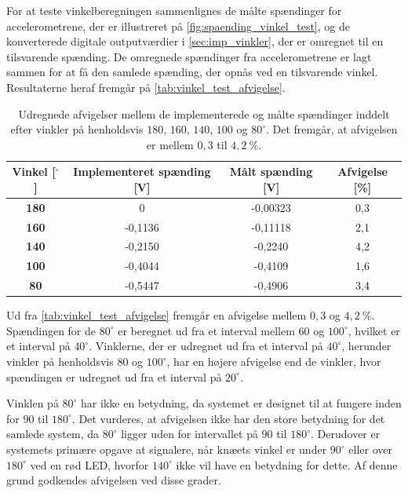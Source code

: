 For at teste vinkelberegningen sammenlignes de målte spændinger for accelerometrene, der er illustreret på \autoref{fig:spaending_vinkel_test}, og de konverterede digitale outputværdier i \autoref{sec:imp_vinkler}, der er omregnet til en tilsvarende spænding. 
De omregnede spændinger fra accelerometrene er lagt sammen for at få den samlede spænding, der opnås ved en tilsvarende vinkel. 
Resultaterne heraf fremgår på \autoref{tab:vinkel_test_afvigelse}.

\begin{table}[H]
\centering
\begin{tabular}{|c|c|c|c|}
\hline
\textbf{Vinkel {[}{$^{\circ}$}{]}} & \textbf{Implementeret spænding {[}V{]}} & \textbf{Målt spænding {[}V{]}} & \textbf{Afvigelse {[}\%{]}} \\ \hline
\textbf{180}                    & 0                         & -0,00323                       & 0,3                      \\ \hline
\textbf{160}                    & -0,1136                   & -0,11118                       & 2,1                       \\ \hline
\textbf{140}                    & -0,2150                   & -0,2240                        & 4,2                   \\ \hline
\textbf{100}                    & -0,4044                   & -0,4109                        & 1,6                    \\ \hline
\textbf{80}                     & -0,5447                   & -0,4906                        & 3,4                    \\ \hline
\end{tabular}
\caption{Udregnede afvigelser mellem de implementerede og målte spændinger inddelt efter vinkler på henholdsvis $180$, $160$, $140$, $100$ og $80^{\circ}$. Det fremgår, at afvigelsen er mellem $0,3$ til $4,2~\%$.}
\label{tab:vinkel_test_afvigelse}
\end{table}

\noindent
Ud fra \autoref{tab:vinkel_test_afvigelse} fremgår en afvigelse mellem $0,3$ og $4,2~\%$. Spændingen for de $80^{\circ}$ er beregnet ud fra et interval mellem $60$ og $100^{\circ}$, hvilket er et interval på $40^{\circ}$. Vinklerne, der er udregnet ud fra et interval på $40^{\circ}$, herunder vinkler på henholdsvis $80$ og $100^{\circ}$, har en højere afvigelse end de vinkler, hvor spændingen er udregnet ud fra et interval på $20^{\circ}$. 


Vinklen på $80^{\circ}$ har ikke en betydning, da systemet er designet til at fungere inden for $90$ til $180^{\circ}$.
Det vurderes, at afvigelsen ikke har den store betydning for det samlede system, da $80^{\circ}$ ligger uden for intervallet på $90$ til $180^{\circ}$. 
Derudover er systemets primære opgave at signalere, når knæets vinkel er under $90^{\circ}$ eller over $180^{\circ}$ ved en rød LED, hvorfor $140^{\circ}$ ikke vil have en betydning for dette. Af denne grund godkendes  afvigelsen ved disse grader. 

